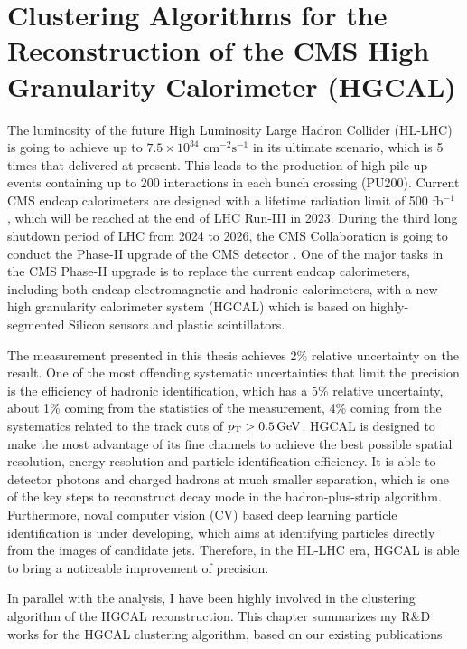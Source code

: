 \chapter{Clustering Algorithms for the Reconstruction of the CMS High Granularity Calorimeter (HGCAL)}
\label{sec:hgcal}


The luminosity of the future High Luminosity Large Hadron Collider (HL-LHC) is going to achieve up to $7.5\times 10^{34}$ $\text{cm}^{-2}\text{s}^{-1}$ \cite{hllhcweb} in its ultimate scenario, which is 5 times that delivered at present. This leads to the production of high pile-up events containing up to 200 interactions in each bunch crossing (PU200). Current CMS endcap calorimeters \cite{Chatrchyan:2008aa} are designed with a lifetime radiation limit of 500 fb$^{-1}$ \cite{CMSCollaboration:2015zni}, which will be reached at the end of LHC Run-III in 2023. During the third long shutdown period of LHC from 2024 to 2026, the CMS Collaboration is going to conduct the Phase-II upgrade of the CMS detector \cite{CMSCollaboration:2015zni}. One of the major tasks in the CMS Phase-II upgrade is to replace the current endcap calorimeters, including both endcap electromagnetic and hadronic calorimeters, with a new high granularity calorimeter system (HGCAL) which is based on highly-segmented Silicon sensors and plastic scintillators.


The \BWl measurement presented in this thesis achieves 2\% relative uncertainty on the \BWt result. One of the most offending systematic uncertainties that limit the precision is the efficiency of hadronic identification, which has a 5\% relative uncertainty, about 1\% coming from the statistics of the measurement, 4\% coming from the systematics related to the track cuts of $p_{\mathrm{T}}>0.5\,\text{Ge\hspace{-.08em}V}$. HGCAL is designed to make the most advantage of its fine channels to achieve the best possible spatial resolution, energy resolution and particle identification efficiency. It is able to detector photons and charged hadrons at much smaller separation, which is one of the key steps to reconstruct \PGth decay mode in the hadron-plus-strip algorithm. Furthermore, noval computer vision (CV) based deep learning particle identification is under developing, which aims at identifying particles directly from the images of candidate jets. Therefore, in the HL-LHC era, HGCAL is able to bring a noticeable improvement of \BWl precision.

In parallel with the \BWl analysis, I have been highly involved in the clustering algorithm of the HGCAL reconstruction. This chapter summarizes my R\&D works for the HGCAL clustering algorithm, based on our existing publications \cite{cluepaper,Chen:2020mih,DiPilato:2020mqs,Chen:2017btc}







% 



